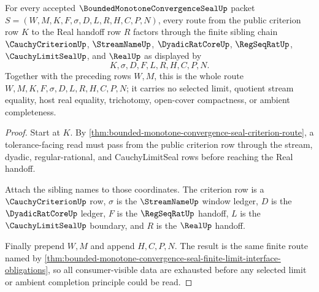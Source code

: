 \begin{theorem}
\label{thm:bounded-monotone-convergence-seal-criterion-to-real-route-totality}
For every accepted $\BoundedMonotoneConvergenceSealUp$ packet $S=(W,M,K,F,\sigma,D,L,R,H,C,P,N)$, every route from the public criterion row $K$ to the Real handoff row $R$ factors through the finite sibling chain $\CauchyCriterionUp$, $\StreamNameUp$, $\DyadicRatCoreUp$, $\RegSeqRatUp$, $\CauchyLimitSealUp$, and $\RealUp$ as displayed by
$$
K,\sigma,D,F,L,R,H,C,P,N.
$$
Together with the preceding rows $W,M$, this is the whole route $W,M,K,F,\sigma,D,L,R,H,C,P,N$; it carries no selected limit, quotient stream equality, host real equality, trichotomy, open-cover compactness, or ambient completeness.
\end{theorem}
\begin{proof}
Start at $K$. By \autoref{thm:bounded-monotone-convergence-seal-criterion-route}, a tolerance-facing read must pass from the public criterion row through the stream, dyadic, regular-rational, and CauchyLimitSeal rows before reaching the Real handoff.

Attach the sibling names to those coordinates. The criterion row is a $\CauchyCriterionUp$ row, $\sigma$ is the $\StreamNameUp$ window ledger, $D$ is the $\DyadicRatCoreUp$ ledger, $F$ is the $\RegSeqRatUp$ handoff, $L$ is the $\CauchyLimitSealUp$ boundary, and $R$ is the $\RealUp$ handoff.

Finally prepend $W,M$ and append $H,C,P,N$. The result is the same finite route named by \autoref{thm:bounded-monotone-convergence-seal-finite-limit-interface-obligations}, so all consumer-visible data are exhausted before any selected limit or ambient completion principle could be read.
\end{proof}

